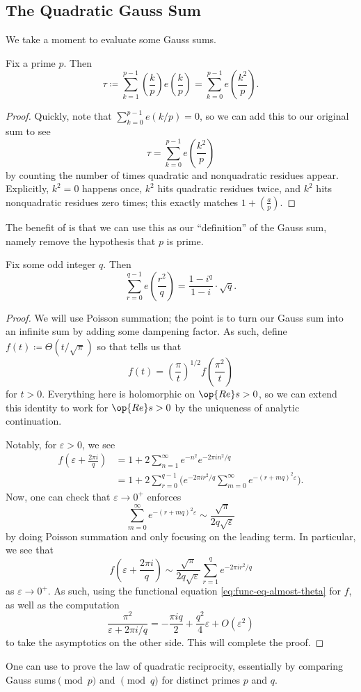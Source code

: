 \documentclass[../notes.tex]{subfiles}
\begin{document}
\subsection{The Quadratic Gauss Sum}
We take a moment to evaluate some Gauss sums.
\begin{lemma} \label{lem:adjust-quad-gauss-sum}
	Fix a prime $p$. Then
	\[\tau\coloneqq\sum_{k=1}^{p-1}\left(\frac kp\right)e\left(\frac kp\right)=\sum_{k=0}^{p-1}e\left(\frac{k^2}p\right).\]
\end{lemma}
\begin{proof}
	Quickly, note that $\sum_{k=0}^{p-1}e(k/p)=0$, so we can add this to our original sum to see
	\[\tau=\sum_{k=0}^{p-1}e\left(\frac{k^2}p\right)\]
	by counting the number of times quadratic and nonquadratic residues appear. Explicitly, $k^2=0$ happens once, $k^2$ hits quadratic residues twice, and $k^2$ hits nonquadratic residues zero times; this exactly matches $1+\left(\frac ap\right)$.
\end{proof}
The benefit of  is that we can use this as our ``definition'' of the Gauss sum, namely remove the hypothesis that $p$ is prime.
\begin{proposition} \label{prop:evaluation-of-gauss-sum}
	Fix some odd integer $q$. Then
	\[\sum_{r=0}^{q-1}e\left(\frac{r^2}q\right)=\frac{1-i^q}{1-i}\cdot\sqrt q.\]
\end{proposition}
\begin{proof}
	We will use Poisson summation; the point is to turn our Gauss sum into an infinite sum by adding some dampening factor. As such, define $f(t)\coloneqq\Theta(t/\sqrt\pi)$ so that  tells us that
	\begin{equation}
		f(t)=\left(\frac\pi t\right)^{1/2}f\left(\frac{\pi^2}t\right) \label{eq:func-eq-almost-theta}
	\end{equation}
	for $t>0$. Everything here is holomorphic on $\op{Re}s>0$, so we can extend this identity to work for $\op{Re}s>0$ by the uniqueness of analytic continuation.

	Notably, for $\varepsilon>0$, we see
	\begin{align*}
		f\left(\varepsilon+\frac{2\pi i}q\right) &= 1+2\sum_{n=1}^\infty e^{-n^2}e^{-2\pi in^2/q} \\
		&= 1+2\sum_{r=0}^{q-1}\Bigg(e^{-2\pi ir^2/q}\sum_{m=0}^\infty e^{-(r+mq)^2\varepsilon}\Bigg).
	\end{align*}
	Now, one can check that $\varepsilon\to0^+$ enforces
	\[\sum_{m=0}^\infty e^{-(r+mq)^2\varepsilon}\sim\frac{\sqrt\pi}{2q\sqrt\varepsilon}\]
	by doing Poisson summation and only focusing on the leading term. In particular, we see that
	\[f\left(\varepsilon+\frac{2\pi i}q\right)\sim\frac{\sqrt\pi}{2q\sqrt\varepsilon}\sum_{r=1}^qe^{-2\pi ir^2/q}\]
	as $\varepsilon\to0^+$. As such, using the functional equation \eqref{eq:func-eq-almost-theta} for $f$, as well as the computation
	\[\frac{\pi^2}{\varepsilon+2\pi i/q}=-\frac{\pi iq}2+\frac{q^2}4\varepsilon+O\left(\varepsilon^2\right)\]
	to take the asymptotics on the other side. This will complete the proof.
\end{proof}
\begin{remark}
	One can use  to prove the law of quadratic reciprocity, essentially by comparing Gauss sums$\pmod p$ and $\pmod q$ for distinct primes $p$ and $q$.
\end{remark}
\end{document}
